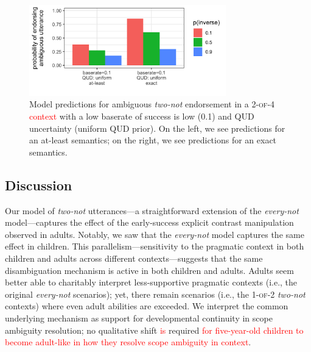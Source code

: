\documentclass[preprint,authoryear]{elsarticle}\frenchspacing
\newcommand{\gcs}[1]{\ifcomments{\textcolor{blue}{[gcs: #1]}}\fi}
\newcommand{\lp}[1]{\textcolor{red}{#1}} %
\begin{document}
\begin{figure}[!ht]
\centering
\includegraphics[height=1.55in]{two-not-four.png}
\vspace{-20pt}
\caption{Model predictions for ambiguous \textit{two-not} endorsement in a \textsc{2-of-4} \lp{context} with a low baserate of success is low (0.1) and QUD uncertainty (uniform QUD prior). On the left, we see predictions for an at-least semantics; on the right, we see predictions for an exact semantics.
}
\label{fig:2of4}
\vspace{-10pt}
\end{figure}

\subsection{Discussion}

Our model of \emph{two-not} utterances---a straightforward extension of the \emph{every-not} model---captures the effect of the early-success explicit contrast manipulation observed in adults. Notably, we saw that the \emph{every-not} model captures the same effect in children. This parallelism---sensitivity to the pragmatic context in both children and adults across different contexts---suggests that the same disambiguation mechanism is active in both children and adults. Adults seem better able to charitably interpret less-supportive pragmatic contexts (i.e., the original \emph{every-not} scenarios); 
yet, there remain scenarios (i.e., the \textsc{1-of-2} \emph{two-not} contexts) %
where even adult abilities are exceeded. We interpret the common underlying mechanism as support for developmental continuity in scope ambiguity resolution;
no qualitative shift \lp{is} required \lp{for five-year-old children to become adult-like in how they resolve scope ambiguity in context}.
\end{document}
